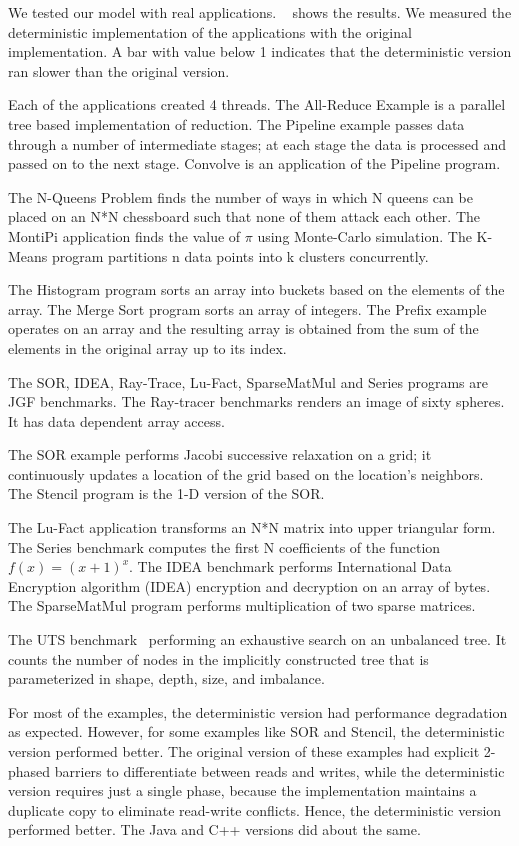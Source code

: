 \documentclass[10pt, conference, compsocconf]{IEEEtran}
\begin{document}
We tested our model with real applications.
~
shows the results. We measured the deterministic implementation of the applications
with the original implementation. A bar with value below 1 indicates that the deterministic
version ran slower than the original version. 

Each of the applications created
4 threads.
The All-Reduce Example is a parallel tree based implementation of reduction.
The Pipeline example passes data through a number of intermediate stages; at each
stage the data is processed and passed on to the next stage. Convolve is an
application of the Pipeline program.

The N-Queens Problem finds the number of ways in which N queens can be placed
on an N*N chessboard such that none of them attack each other. The MontiPi application
finds the value of $\pi$ using Monte-Carlo simulation. The K-Means program partitions
n data points into k clusters concurrently.

The Histogram program sorts an array into buckets based on the elements of the array.
The Merge Sort program sorts an array of integers.
The Prefix example operates on an array and the resulting array is obtained from the sum
of the elements in the original array up to its index.

The SOR, IDEA, Ray-Trace, Lu-Fact, SparseMatMul and Series programs are JGF benchmarks.
The Ray-tracer benchmarks renders an image of sixty spheres. It has data dependent
array access.

The SOR example performs Jacobi successive relaxation
on a grid; it continuously updates a location of the grid based on the location's
neighbors.
The Stencil program is the  1-D version of the SOR.

The Lu-Fact application transforms an N*N matrix into upper triangular form. The Series benchmark
computes the first N coefficients of the function $f(x) = (x+1)^x$. The IDEA benchmark
performs International Data Encryption algorithm  (IDEA) encryption and decryption on an array
of bytes.
The SparseMatMul program performs multiplication of two sparse matrices.


The UTS  benchmark~\cite{olivier2006uts}
performing an exhaustive search on an unbalanced tree.
It  counts the number of
nodes in  the implicitly constructed tree that is parameterized in
 shape, depth, size, and imbalance.

For most of the examples, the deterministic version had  performance degradation
 as expected. However, for some examples like SOR and Stencil, the deterministic
version performed better. The original version of these examples had explicit 2-phased 
barriers to differentiate between reads and writes, while the deterministic
version requires just a single phase, because the implementation maintains
 a duplicate copy 
to eliminate read-write conflicts. Hence, the deterministic
version performed better. The Java and C++ versions did about the same.
\end{document}
